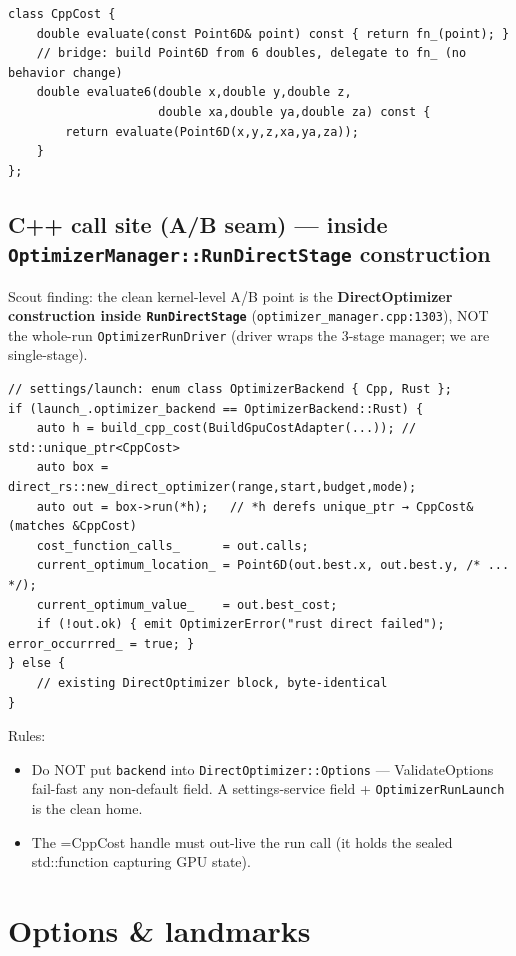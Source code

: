 \documentclass[11pt]{article}
\begin{document}
\begin{verbatim}
class CppCost {
    double evaluate(const Point6D& point) const { return fn_(point); }
    // bridge: build Point6D from 6 doubles, delegate to fn_ (no behavior change)
    double evaluate6(double x,double y,double z,
                     double xa,double ya,double za) const {
        return evaluate(Point6D(x,y,z,xa,ya,za));
    }
};
\end{verbatim}
\subsection{C++ call site (A/B seam) — inside \texttt{OptimizerManager::RunDirectStage} construction}
\label{sec:org6d3f999}

Scout finding: the clean kernel-level A/B point is the \textbf{DirectOptimizer
construction inside \texttt{RunDirectStage}} (\texttt{optimizer\_manager.cpp:1303}), NOT the
whole-run \texttt{OptimizerRunDriver} (driver wraps the 3-stage manager; we are
single-stage).

\begin{verbatim}
// settings/launch: enum class OptimizerBackend { Cpp, Rust };
if (launch_.optimizer_backend == OptimizerBackend::Rust) {
    auto h = build_cpp_cost(BuildGpuCostAdapter(...)); // std::unique_ptr<CppCost>
    auto box = direct_rs::new_direct_optimizer(range,start,budget,mode);
    auto out = box->run(*h);   // *h derefs unique_ptr → CppCost& (matches &CppCost)
    cost_function_calls_      = out.calls;
    current_optimum_location_ = Point6D(out.best.x, out.best.y, /* ... */);
    current_optimum_value_    = out.best_cost;
    if (!out.ok) { emit OptimizerError("rust direct failed"); error_occurrred_ = true; }
} else {
    // existing DirectOptimizer block, byte-identical
}
\end{verbatim}

Rules:

\begin{itemize}
\item Do NOT put \texttt{backend} into \texttt{DirectOptimizer::Options} — ValidateOptions
fail-fast any non-default field. A settings-service field +
\texttt{OptimizerRunLaunch} is the clean home.
\item The =CppCost handle must out-live the run call (it holds the sealed
std::function capturing GPU state).
\end{itemize}
\section{Options \& landmarks}
\label{sec:orgcd1847a}
\end{document}
